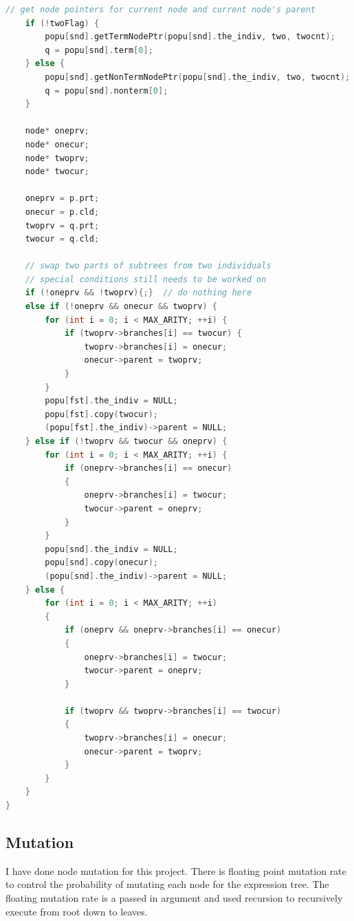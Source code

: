 \documentclass[10pt,b5paper]{article}
\begin{document}
\begin{lstlisting}[language=c++]
    // get node pointers for current node and current node's parent
    if (!twoFlag) {        
        popu[snd].getTermNodePtr(popu[snd].the_indiv, two, twocnt);
        q = popu[snd].term[0];
    } else {        
        popu[snd].getNonTermNodePtr(popu[snd].the_indiv, two, twocnt);
        q = popu[snd].nonterm[0];
    }

    node* oneprv;
    node* onecur;
    node* twoprv;
    node* twocur;
    
    oneprv = p.prt;
    onecur = p.cld;
    twoprv = q.prt;
    twocur = q.cld;

    // swap two parts of subtrees from two individuals
    // special conditions still needs to be worked on
    if (!oneprv && !twoprv){;}  // do nothing here
    else if (!oneprv && onecur && twoprv) {    
        for (int i = 0; i < MAX_ARITY; ++i) {        
            if (twoprv->branches[i] == twocur) {            
                twoprv->branches[i] = onecur;
                onecur->parent = twoprv;
            }
        }
        popu[fst].the_indiv = NULL;
        popu[fst].copy(twocur);
        (popu[fst].the_indiv)->parent = NULL;
    } else if (!twoprv && twocur && oneprv) {
        for (int i = 0; i < MAX_ARITY; ++i) {        
            if (oneprv->branches[i] == onecur) 
            {
                oneprv->branches[i] = twocur;
                twocur->parent = oneprv;
            }
        }
        popu[snd].the_indiv = NULL;
        popu[snd].copy(onecur);
        (popu[snd].the_indiv)->parent = NULL;
    } else {    
        for (int i = 0; i < MAX_ARITY; ++i) 
        {
            if (oneprv && oneprv->branches[i] == onecur) 
            {
                oneprv->branches[i] = twocur;
                twocur->parent = oneprv;
            }
        
            if (twoprv && twoprv->branches[i] == twocur)
            {
                twoprv->branches[i] = onecur;
                onecur->parent = twoprv;
            }
        }
    }
}
\end{lstlisting}
\subsection{Mutation}
\label{sec-1-3}
I have done node mutation for this project. There is floating point mutation rate to control the probability of mutating each node for the expression tree. The floating mutation rate is a passed in argument and used recursion to recursively execute from root down to leaves. 
\end{document}
